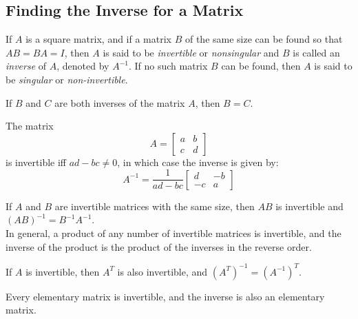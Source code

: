 \documentclass{report}
\begin{document}
		\subsection{Finding the Inverse for a Matrix}
		\begin{defn}[Inverse]
			If $A$ is a square matrix, and if a matrix $B$ of the same size can be found so that $AB=BA=I$, then $A$ is said to be \emph{invertible} or \emph{nonsingular} and $B$ is called an \emph{inverse} of $A$, denoted by $A^{-1}$. If no such matrix $B$ can be found, then $A$ is said to be \emph{singular} or \emph{non-invertible}.
		\end{defn}
		
		\begin{thm}
			If $B$ and $C$ are both inverses of the matrix $A$, then $B=C$.
		\end{thm}
		
		\begin{thm}
			The matrix
			\begin{displaymath}
				A=
				\begin{bmatrix}
					a & b \\ c & d
				\end{bmatrix}
			\end{displaymath}
			is invertible iff $ad-bc\ne0$, in which case the inverse is given by:
			\begin{displaymath}
				A^{-1}=\frac{1}{ad-bc}
				\begin{bmatrix}
					d & -b \\ -c & a
				\end{bmatrix}
			\end{displaymath}
		\end{thm}
		
		\begin{thm}
			If $A$ and $B$ are invertible matrices with the same size, then $AB$ is invertible and $(AB)^{-1}=B^{-1}A^{-1}$.\\
			In general, a product of any number of invertible matrices is invertible, and the inverse of the product is the product of the inverses in the reverse order.
		\end{thm}
		
		\begin{thm}
			If $A$ is invertible, then $A^T$ is also invertible, and $(A^T)^{-1}=(A^{-1})^T$.
		\end{thm}
		
		\begin{thm}
			Every elementary matrix is invertible, and the inverse is also an elementary matrix.
		\end{thm}
		
\end{document}
